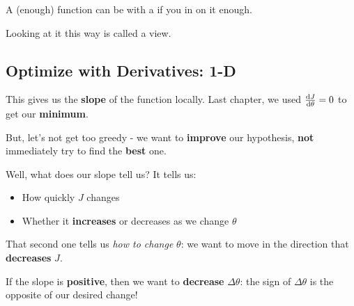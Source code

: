         
        \begin{concept}
            A  (enough) function can be  with a  if you  in on it enough.
            
            Looking at it this way is called a  view.
        \end{concept}
        
        
        
    \subsection{Optimize with Derivatives: 1-D}
        
        This gives us the \textbf{slope} of the function locally. Last chapter, we used $\frac{\dd J}{\dd \theta}=0$ to get our \textbf{minimum}.
        
        But, let's not get too greedy - we want to \textbf{improve} our hypothesis, \textbf{not} immediately try to find the \textbf{best} one.
        
        Well, what does our slope tell us? It tells us:
        
        \begin{itemize}
            \item How quickly $J$ changes
            \item Whether it \textbf{increases} or decreases as we change $\theta$
        \end{itemize}
        
        That second one tells us \textit{how to change} $\theta$: we want to move in the direction that \textbf{decreases} $J$.
        
        If the slope is \textbf{positive}, then we want to \textbf{decrease} $\Delta \theta$: the sign of $\Delta \theta$ is the opposite of our desired change!
        
